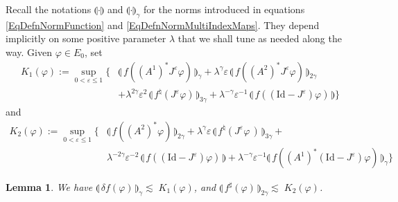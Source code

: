 \documentclass[11pt,a4paper]{amsart}
\renewcommand{\leq}{\leqslant}
\theoremstyle{plain}%
\newtheorem{lemma}[theorem]{Lemma}
\theoremstyle{definition}
\theoremstyle{remark}
\numberwithin{equation}{section} %
\begin{document}
Recall the notations $\llparenthesis \cdot\rrparenthesis$ and $\llparenthesis \cdot\rrparenthesis_\gamma$ for the norms introduced in equations \eqref{EqDefnNormFunction} and \eqref{EqDefnNormMultiIndexMaps}. They depend implicitly on some positive parameter $\lambda$ that we shall tune as needed along the way. 
%
Given $\varphi\in E_0$, set 
\begin{equation*}
\begin{split}
K_1(\varphi) := \sup_{0 < \varepsilon \leq 1} \{& \llparenthesis\, f((A^1)^* J^\varepsilon\varphi)\,\rrparenthesis_\gamma
+ \lambda^{\gamma} \varepsilon \, \llparenthesis\, f( (A^2)^* J^\varepsilon \varphi) \,\rrparenthesis_{2\gamma}  \\ 
&+ \lambda^{2\gamma}\varepsilon^2\, \llparenthesis\, f^\natural (  J^\varepsilon\varphi) \,\rrparenthesis_{3\gamma} + \lambda^{-\gamma}\varepsilon^{-1} \,\llparenthesis\, f((\textrm{Id} - J^\varepsilon)\varphi) \,\rrparenthesis \}
\end{split}
\end{equation*}
and
\begin{equation*}
\begin{split}
K_2(\varphi) := \sup_{0 < \varepsilon \leq 1} \{&  \llparenthesis\, f((A^2)^* \varphi) \,\rrparenthesis_{2\gamma}  + \lambda^{\gamma}\varepsilon\,\llparenthesis\, f^\natural (  J^\varepsilon  \varphi\,) \,\rrparenthesis_{3\gamma} + \\ 
& \lambda^{-2\gamma}\varepsilon^{-2} \, \llparenthesis\, f((\textrm{Id} - J^\varepsilon) \varphi) \,\rrparenthesis + \lambda^{-\gamma} \varepsilon^{-1} \llparenthesis\, f((A^1)^*(\textrm{Id} - J^\varepsilon)\varphi) \,\rrparenthesis_\gamma  \}
\end{split}
\end{equation*}

\smallskip

\begin{lemma}
\label{LemmaGeneralImproveEstimates}
We have $\llparenthesis\, \delta f(\varphi) \,\rrparenthesis_\gamma \lesssim\; K_1(\varphi)$, and $\llparenthesis\,  f^\sharp(\varphi) \,\rrparenthesis_{2\gamma} \lesssim\; K_2(\varphi)$.
\end{lemma}

\medskip
\end{document}

